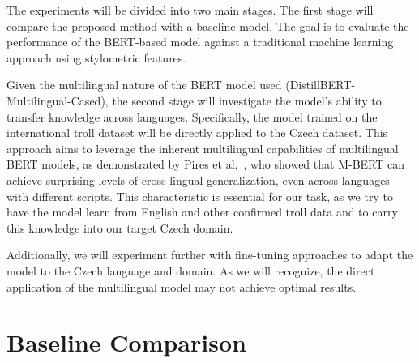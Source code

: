 \documentclass[twoside]{ctuthesis}
\theoremstyle{plain}
\theoremstyle{definition}
\theoremstyle{note}
\begin{document}
The experiments will be divided into two main stages. The first stage will compare the proposed method with a baseline model. The goal is to evaluate the performance of the BERT-based model against a traditional machine learning approach using stylometric features.\par
Given the multilingual nature of the BERT model used (DistillBERT-Multilingual-Cased), the second stage will investigate the model's ability to transfer knowledge across languages. Specifically, the model trained on the international troll dataset will be directly applied to the Czech dataset. This approach aims to leverage the inherent multilingual capabilities of multilingual BERT models, as demonstrated by Pires et al.~\cite{Pires2019}, who showed that M-BERT can achieve surprising levels of cross-lingual generalization, even across languages with different scripts. This characteristic is essential for our task, as we try to have the model learn from English and other confirmed troll data and to carry this knowledge into our target Czech domain.\par
Additionally, we will experiment further with fine-tuning approaches to adapt the model to the Czech language and domain. As we will recognize, the direct application of the multilingual model may not achieve optimal results.\par


\section{Baseline Comparison}
\end{document}
